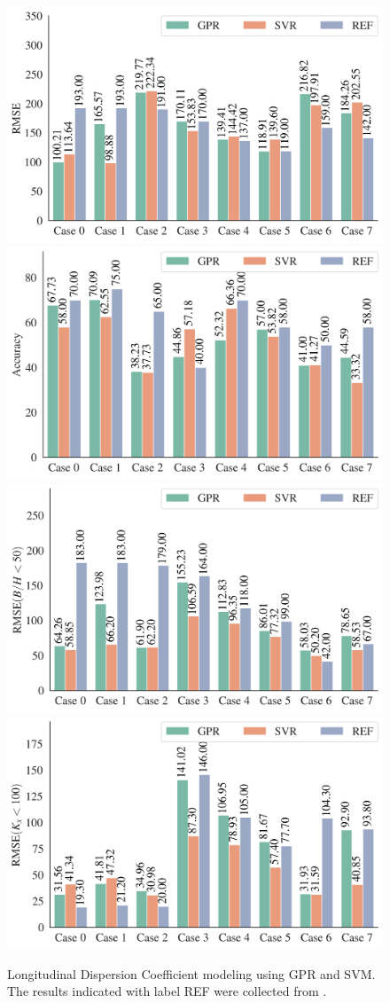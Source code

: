 \documentclass[a4paper,12pt, english]{article}
\begin{document}
% 
% 
  
\begin{figure}[!htb]
 \centering
 \includegraphics[width=0.495\linewidth]{./results/eml____300dpi_comparison_datasets_metric_rmse_bar}
 \includegraphics[width=0.495\linewidth]{./results/eml____300dpi_comparison_datasets_metric_accuracy_bar}
 \includegraphics[width=0.495\linewidth]{./results/eml____300dpi_comparison_datasets_metric_rmsebh_50_bar}
 \includegraphics[width=0.495\linewidth]{./results/eml____300dpi_comparison_datasets_metric_rmsek_x_100_bar}
 \caption{
 \label{fig:eml____300dpi_comparison_datasets_metric}
 Longitudinal Dispersion Coefficient modeling using GPR and SVM.
 The results indicated with label REF were collected from \cite{tayfur2005predicting}. 
 }
\end{figure}
\end{document}

